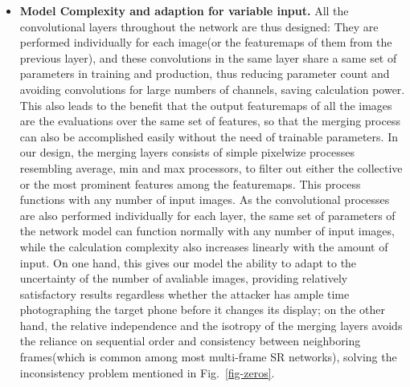 \begin{itemize}[leftmargin=*]
  \item \textbf{Model Complexity and adaption for variable input.} All the convolutional layers throughout the network are thus designed: They are performed individually for each image(or the featuremaps of them from the previous layer), and these convolutions in the same layer share a same set of parameters in training and production, thus reducing parameter count and avoiding convolutions for large numbers of channels, saving calculation power. This also leads to the benefit that the output featuremaps of all the images are the evaluations over the same set of features, so that the merging process can also be accomplished easily without the need of trainable parameters. In our design, the merging layers consists of simple pixelwize processes resembling average, min and max processors, to filter out either the collective or the most prominent features among the featuremaps. This process functions with any number of input images. As the convolutional processes are also performed individually for each layer, the same set of parameters of the network model can function normally with any number of input images, while the calculation complexity also increases linearly with the amount of input. On one hand, this gives our model the ability to adapt to the uncertainty of the number of avaliable images, providing relatively satisfactory results regardless whether the attacker has ample time photographing the target phone before it changes its display; on the other hand, the relative independence and the isotropy of the merging layers avoids the reliance on sequential order and consistency between neighboring frames(which is common among most multi-frame SR networks), solving the inconsistency problem mentioned in Fig.~\ref{fig-zeros}.

\end{itemize}
